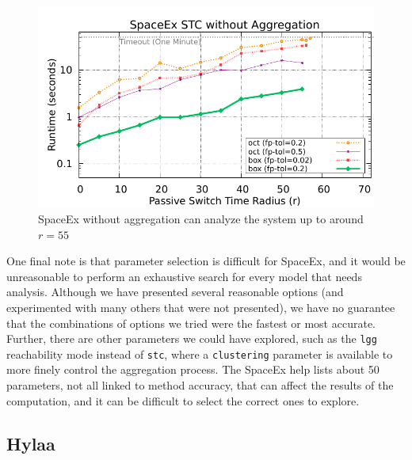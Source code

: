 \begin{figure}[t]
\centerline{\includegraphics[width=0.9\columnwidth]{images/unagg.pdf}}
\caption{SpaceEx without aggregation can analyze the system up to around $r=55$}
\label{fig:spaceex_unagg}
\end{figure}

One final note is that parameter selection is difficult for SpaceEx, and it would be unreasonable to perform an exhaustive search for every model
that needs analysis.
%
Although we have presented several reasonable options (and experimented with many others that were not presented), we have no guarantee that
the combinations of options we tried were the fastest or most accurate.
%
Further, there are other parameters we could have explored, such as the \texttt{lgg} reachability mode instead of \texttt{stc}, where a \texttt{clustering}
parameter is available to more finely control the aggregation process.
%
The SpaceEx help lists about 50 parameters, not all linked to method accuracy, that can affect the results of the computation,
and it can be difficult to select the correct ones to explore.

\subsection{Hylaa}

